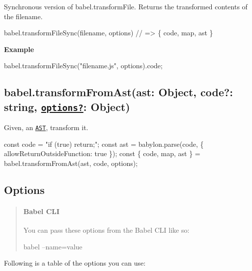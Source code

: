 Synchronous version of {\ttfamily babel.\+transform\+File}. Returns the transformed contents of the {\ttfamily filename}.


\begin{DoxyCode}
babel.transformFileSync(filename, options) // => \{ code, map, ast \}
\end{DoxyCode}


{\bfseries Example}


\begin{DoxyCode}
babel.transformFileSync("filename.js", options).code;
\end{DoxyCode}


\subsection*{babel.\+transform\+From\+Ast(ast\+: Object, code?\+: string, \href{#options}{\tt options?}\+: Object)}

Given, an \href{https://astexplorer.net/}{\tt A\+ST}, transform it.


\begin{DoxyCode}
const code = "if (true) return;";
const ast = babylon.parse(code, \{ allowReturnOutsideFunction: true \});
const \{ code, map, ast \} = babel.transformFromAst(ast, code, options);
\end{DoxyCode}


\subsection*{Options}

\begin{quote}
\paragraph*{Babel C\+LI}



You can pass these options from the Babel C\+LI like so\+: 



{\ttfamily babel --name=value} 

\end{quote}


Following is a table of the options you can use\+:

